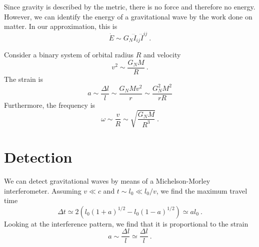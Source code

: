     Since gravity is described by the metric, there is no force and therefore no energy. However, we can identify the energy of a gravitational wave by the work done on matter. In our approximation, this is 
    \begin{equation*}
        \dot E \sim G_N \dddot I_{ij} \dddot I^{ij} ~.
    \end{equation*}

    Consider a binary system of orbital radius $R$ and velocity 
    \begin{equation*}
        v^2 \sim \frac{G_N M}{R} ~.
    \end{equation*}
    The strain is 
    \begin{equation*}
        a \sim \frac{\Delta l}{l} \sim \frac{G_N M v^2}{r} \sim \frac{G_N^2 M^2}{r R} 
    \end{equation*}
    Furthermore, the frequency is 
    \begin{equation*}
        \omega \sim \frac{v}{R} \sim \sqrt{\frac{G_N M}{R^3}} ~.
    \end{equation*}

\section{Detection}

    We can detect gravitational waves by means of a Michelson-Morley interferometer. Assuming $v \ll c$ and $t \sim l_0 \ll l_0 / v$, we find the maximum travel time 
    \begin{equation*}
        \Delta t \simeq 2 (l_0 (1 + a)^{1/2} - l_0 (1 - a)^{1/2} ) \simeq a l_0 ~.
    \end{equation*}
    Looking at the interference pattern, we find that it is proportional to the strain 
    \begin{equation*}
        a \sim \frac{\Delta l}{l} \simeq \frac{\Delta l}{l} ~.
    \end{equation*}
